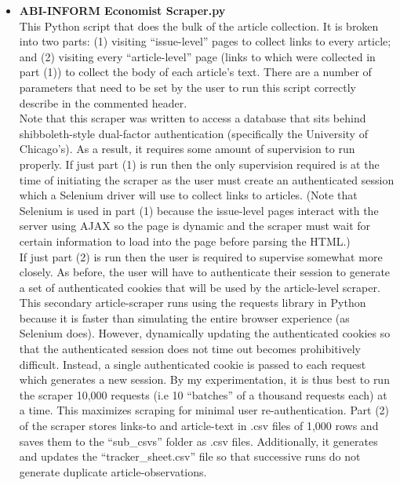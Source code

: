 \documentclass[11pt, letterpaper, twoside]{article}
\begin{document}
\begin{itemize}
    \item \textbf{ABI-INFORM Economist Scraper.py}\\
    This Python script that does the bulk of the article collection. It is broken into two parts: (1) visiting ``issue-level'' pages to collect links to every article; and (2) visiting every ``article-level'' page (links to which were collected in part (1)) to collect the body of each article's text. There are a number of parameters that need to be set by the user to run this script correctly describe in the commented header.\\
    
    Note that this scraper was written to access a database that sits behind shibboleth-style dual-factor authentication (specifically the University of Chicago's). As a result, it requires some amount of supervision to run properly. If just part (1) is run then the only supervision required is at the time of initiating the scraper as the user must create an authenticated session which a Selenium driver will use to collect links to articles. (Note that Selenium is used in part (1) because the issue-level pages interact with the server using AJAX so the page is dynamic and the scraper must wait for certain information to load into the page before parsing the HTML.)\\

    If just part (2) is run then the user is required to supervise somewhat more closely. As before, the user will have to authenticate their session to generate a set of authenticated cookies that will be used by the article-level scraper. This secondary article-scraper runs using the requests library in Python because it is faster than simulating the entire browser experience (as Selenium does). However, dynamically updating the authenticated cookies so that the authenticated session does not time out becomes prohibitively difficult. Instead, a single authenticated cookie is passed to each request which generates a new session. By my experimentation, it is thus best to run the scraper 10,000 requests (i.e 10 ``batches'' of a thousand requests each) at a time. This maximizes scraping for minimal user re-authentication. Part (2) of the scraper stores links-to and article-text in .csv files of 1,000 rows and saves them to the ``sub\_csvs'' folder as .csv files. Additionally, it generates and updates the ``tracker\_sheet.csv'' file so that successive runs do not generate duplicate article-observations.\\


\end{itemize}
\end{document}
